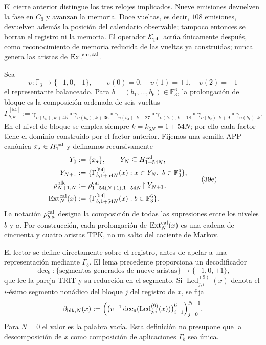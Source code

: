 El cierre anterior distingue los tres relojes implicados. Nueve emisiones
devuelven la fase en \(C_9\) y avanzan la memoria. Doce vueltas, es decir,
\(108\) emisiones, devuelven además la posición del calendario observable;
tampoco entonces se borran el registro ni la memoria. El operador
\(\mathcal K_{\rm ph}\) actúa únicamente después, como reconocimiento de
memoria reducida de las vueltas ya construidas; nunca genera las aristas de
\(\operatorname{Ext}^{\rm enr,cal}\).



Sea
\[
 \upsilon:\mathbb F_3\longrightarrow\{-1,0,+1\},\qquad
 \upsilon(0)=0,\quad\upsilon(1)=+1,\quad\upsilon(2)=-1
\]
el representante balanceado. Para
\(b=(b_1,\ldots,b_6)\in\mathbb F_3^6\), la prolongación de bloque es la
composición ordenada de seis vueltas
\[
 \Gamma_{b,k}^{[54]}:=
 \gamma_{\upsilon(b_6),k+45}\circ\gamma_{\upsilon(b_5),k+36}\circ
 \gamma_{\upsilon(b_4),k+27}\circ\gamma_{\upsilon(b_3),k+18}\circ
 \gamma_{\upsilon(b_2),k+9}\circ\gamma_{\upsilon(b_1),k}.
\tag{39d}
\label{ix:eq:gamma-bloque-54-ch}
\]
En el nivel de bloque se emplea siempre
\(k=k_{6N}=1+54N\); por ello cada factor tiene el dominio construido por el
factor anterior.
Fijemos una semilla APP canónica \(x_\star\in H^{\rm cal}_1\) y definamos
recursivamente
\[
 \begin{aligned}
  Y_0&:=\{x_\star\},\qquad Y_N\subseteq H_{1+54N}^{\rm cal},\\
  Y_{N+1}&:=\{\Gamma_{b,1+54N}^{[54]}(x):
                 x\in Y_N,\ b\in\mathbb F_3^6\},\\
  \rho^{\rm blk}_{N+1,N}
    &:=\rho^{\rm cal}_{1+54(N+1),1+54N}
       \!\upharpoonright Y_{N+1},\\
  \operatorname{Ext}^{\rm cal}_N(x)
    &:=\{\Gamma_{b,1+54N}^{[54]}(x):b\in\mathbb F_3^6\}.
 \end{aligned}
\tag{39e}
\label{ix:eq:sincronizacion-54-ch}
\]
La notación \(\rho^{\rm cal}_{b,a}\) designa la composición de todas las supresiones
entre los niveles \(b\) y \(a\). Por construcción, cada prolongación de
\(\operatorname{Ext}^{\rm cal}_N(x)\) es una cadena de cincuenta y cuatro
aristas TPK, no un salto del cociente de Markov.

El lector se define directamente sobre el registro, antes de apelar a una
representación mediante \(\Gamma_b\). El lema precedente proporciona un
decodificador
\[
 \operatorname{dec}_9:\{\text{segmentos generados de nueve aristas}\}
 \longrightarrow\{-1,0,+1\},
\]
que lee la pareja TRIT y su reducción en el segmento. Si
\(\operatorname{Led}^{(9)}_{j,i}(x)\) denota el \(i\)-ésimo segmento nonádico
del bloque \(j\) del registro de \(x\), se fija
\begin{equation}
 \beta_{{\rm blk},N}(x):=
 \Bigl(
   \bigl(\upsilon^{-1}\operatorname{dec}_9
          (\operatorname{Led}^{(9)}_{j,i}(x))\bigr)_{i=1}^{6}
 \Bigr)_{j=0}^{N-1}.
 \label{ix:eq:lector-bloques-ch}
\end{equation}
Para \(N=0\) el valor es la palabra vacía. Esta definición no presupone que
la descomposición de \(x\) como composición de aplicaciones \(\Gamma_b\) sea
única.

